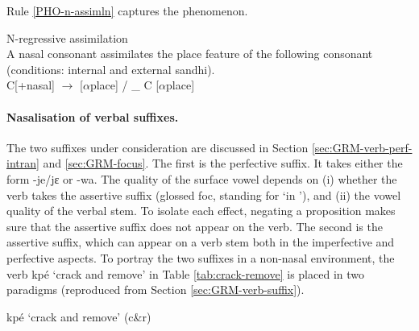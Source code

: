 Rule \ref{PHO-n-assimln} captures the phenomenon.
% 
\begin{Rule}\label{PHO-n-assimln}{N-regressive assimilation}\\
A nasal consonant assimilates the place feature of the following consonant
 (conditions: internal and external sandhi).\\
C[{\sc +nasal}] $\rightarrow$   [$\alpha${\sc place}] /  \_  C [$\alpha${\sc place}]
\end{Rule}



\paragraph{Nasalisation of verbal suffixes.}
\label{sec:nasalisation-verb-suffix}

The two suffixes under consideration are discussed in Section
\ref{sec:GRM-verb-perf-intran}
and \ref{sec:GRM-focus}.  The first is  the perfective suffix.  It takes
either the form {\sls -je/jɛ} or {\sls -wa}.
The quality of the surface vowel depends on (i) whether the verb takes the
assertive suffix (glossed {\sc foc}, standing for `in '),  and (ii) the
vowel quality of the verbal stem. To isolate each effect, negating a proposition
makes sure that the assertive suffix does not appear on the verb. The second is
the assertive suffix, which can appear on a verb stem both in the imperfective
and perfective aspects.  To portray the two suffixes in a non-nasal environment,
 the verb {\sls kpé} `crack and remove' in Table \ref{tab:crack-remove}  is 
placed in two paradigms (reproduced from Section \ref{sec:GRM-verb-suffix}). 



\begin{table}


\caption{{\sls kpé} {\rm `crack
and remove'} (c\&r)  \label{tab:crack-remove}}

\quad
{}
\end{table}


